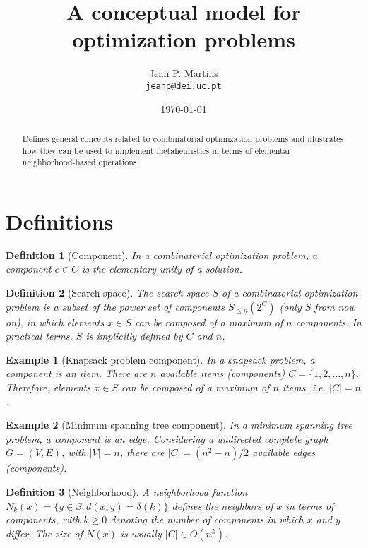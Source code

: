 \documentclass[12pt,a4paper,onecolumn]{amsart}
\author{Jean P. Martins\\ \texttt{\lowercase{jeanp@dei.uc.pt}}}
\title{A conceptual model for optimization problems}
\date{\today}
\begin{document}
\begin{abstract}
Defines general concepts related to combinatorial optimization problems and illustrates how they can be used to implement metaheuristics in terms of elementar neighborhood-based operations.
\end{abstract}

\maketitle

\newtheorem{definition}{Definition}[section]
\newtheorem{example}{Example}[section]

\section{Definitions}

\begin{definition}[Component]
In a combinatorial optimization problem, a component $c\in C$ is the elementary unity of a solution. 
\end{definition}

\begin{definition}[Search space]
The search space $S$ of a combinatorial optimization problem is a subset of the power set of components $S_{\leq n}(2^C)$ (only $S$ from now on), in which elements $x\in S$ can be composed of a maximum of $n$ components. In practical terms, $S$ is implicitly defined by $C$ and $n$.
\end{definition}

\begin{tcolorbox}
	\begin{example}[Knapsack problem component]
	In a knapsack problem, a component is an item. There are $n$ available items (components) $C=\{1,2,\dots,n\}$. Therefore, elements $x\in S$ can be composed of a maximum of $n$ items, i.e. $|C| = n$. 
	\end{example}
	
	\begin{example}[Minimum spanning tree component]
	In a minimum spanning tree problem, a component is an edge. Considering a undirected complete graph $G=(V,E)$, with $|V|=n$, there are $|C| = {(n^2 - n)}/{2}$ available edges (components). 
	\end{example}
\end{tcolorbox}

\begin{definition}[Neighborhood]
A neighborhood function $N_{k}(x) = \{y\in S : d(x,y) = \delta(k)\}$ defines the neighbors of $x$ in terms of components, with $k\geq 0$ denoting the number of components in which $x$ and $y$ differ. The size of $N(x)$ is usually $|C|\in O(n^k)$.
\end{definition}
\end{document}
